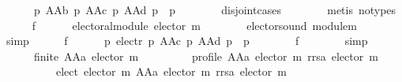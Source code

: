 \begin{isabellebody}
\ \ \ \ \ \ {\isachardoublequoteopen}{\isasymforall}p{\isachardot}{\kern0pt}\ {\isacharparenleft}{\kern0pt}AAb\ p{\isacharcomma}{\kern0pt}\ AAc\ p{\isacharcomma}{\kern0pt}\ AAd\ p{\isacharparenright}{\kern0pt}\ {\isacharequal}{\kern0pt}\ p{\isachardoublequoteclose}\isanewline
\ \ \ \ \ \ \isamarkupfalse%
\ disjoint{}{\isachardot}{\kern0pt}cases\isanewline
\ \ \ \ \ \ \isamarkupfalse%
\ {\isacharparenleft}{\kern0pt}metis\ {\isacharparenleft}{\kern0pt}no{\isacharunderscore}{\kern0pt}types{\isacharparenright}{\kern0pt}{\isacharparenright}{\kern0pt}\isanewline
\ \ \ \ \isamarkupfalse%
\ f{}{\isacharcolon}{\kern0pt}\isanewline
\ \ \ \ \ \ {\isachardoublequoteopen}electoral{\isacharunderscore}{\kern0pt}module\ {\isacharparenleft}{\kern0pt}elector\ m{\isacharparenright}{\kern0pt}{\isachardoublequoteclose}\isanewline
\ \ \ \ \ \ \isamarkupfalse%
\ elector{\isacharunderscore}{\kern0pt}sound\ module{\isacharunderscore}{\kern0pt}m\isanewline
\ \ \ \ \ \ \isamarkupfalse%
\ simp\isanewline
\ \ \ \ \isamarkupfalse%
\ f{}{\isacharcolon}{\kern0pt}\isanewline
\ \ \ \ \ \ {\isachardoublequoteopen}{\isasymforall}p{\isachardot}{\kern0pt}\ {\isacharparenleft}{\kern0pt}elect{\isacharunderscore}{\kern0pt}r\ p{\isacharcomma}{\kern0pt}\ AAc\ p{\isacharcomma}{\kern0pt}\ AAd\ p{\isacharparenright}{\kern0pt}\ {\isacharequal}{\kern0pt}\ p{\isachardoublequoteclose}\isanewline
\ \ \ \ \ \ \isamarkupfalse%
\ f{}\isanewline
\ \ \ \ \ \ \isamarkupfalse%
\ simp\isanewline
\ \ \ \ \isamarkupfalse%
\isanewline
\ \ \ \ \ \ {\isachardoublequoteopen}finite\ {\isacharparenleft}{\kern0pt}AAa\ {\isacharparenleft}{\kern0pt}elector\ m{\isacharparenright}{\kern0pt}{\isacharparenright}{\kern0pt}\ {\isasymand}\isanewline
\ \ \ \ \ \ \ \ profile\ {\isacharparenleft}{\kern0pt}AAa\ {\isacharparenleft}{\kern0pt}elector\ m{\isacharparenright}{\kern0pt}{\isacharparenright}{\kern0pt}\ {\isacharparenleft}{\kern0pt}rrsa\ {\isacharparenleft}{\kern0pt}elector\ m{\isacharparenright}{\kern0pt}{\isacharparenright}{\kern0pt}\ {\isasymand}\isanewline
\ \ \ \ \ \ \ \ {\isacharbraceleft}{\kern0pt}{\isacharbraceright}{\kern0pt}\ {\isacharequal}{\kern0pt}\ elect\ {\isacharparenleft}{\kern0pt}elector\ m{\isacharparenright}{\kern0pt}\ {\isacharparenleft}{\kern0pt}AAa\ {\isacharparenleft}{\kern0pt}elector\ m{\isacharparenright}{\kern0pt}{\isacharparenright}{\kern0pt}\ {\isacharparenleft}{\kern0pt}rrsa\ {\isacharparenleft}{\kern0pt}elector\ m{\isacharparenright}{\kern0pt}{\isacharparenright}{\kern0pt}\ {\isasymand}\isanewline

\end{isabellebody}
